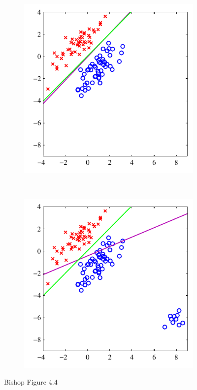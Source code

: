 \begin{figure}
	\centering
	\begin{subfigure}[b]{0.45\textwidth}
		\includegraphics[width=\textwidth]{./lecture6/Figure44a.pdf}
	\end{subfigure}
	~
	\begin{subfigure}[b]{0.45\textwidth}
		\includegraphics[width=\textwidth]{./lecture6/Figure44b.pdf}
	\end{subfigure}
	\caption{Bishop Figure 4.4}
	\label{fig:least_sq_class}
\end{figure}




